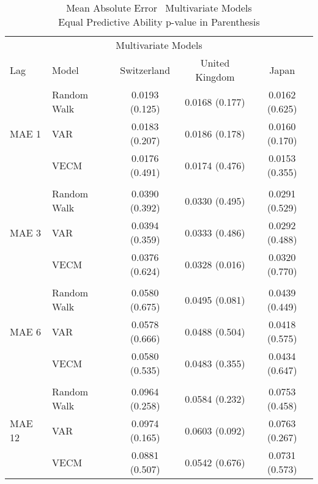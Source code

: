 \begin{table}[!h] %
  \centering
  \caption{Mean Absolute Error \textendash \ Multivariate Models \\
           Equal Predictive Ability p-value in Parenthesis}
  \begin{tabular}{llccc} %
    \toprule
    \multicolumn{5}{c}{Multivariate Models}                      \\
    \cmidrule(r){1-5}
    Lag                           &   Model                                     &Switzerland       & United Kingdom & Japan\\
    \midrule
    \multirow{3}{*}{MAE 1}        & \multicolumn{1}{l}{Random Walk}             &   0.0193 (0.125) & 0.0168 (0.177) & 0.0162 (0.625)\\  
                                  & \multicolumn{1}{l}{VAR}                     &   0.0183 (0.207) & 0.0186 (0.178) & 0.0160 (0.170)\\ 
                                  & \multicolumn{1}{l}{VECM}                    &   0.0176 (0.491) & 0.0174 (0.476) & 0.0153 (0.355)\\
    \\
    \multirow{3}{*}{MAE 3}        & \multicolumn{1}{l}{Random Walk}             &   0.0390 (0.392) & 0.0330 (0.495) & 0.0291 (0.529)\\ 
                                  & \multicolumn{1}{l}{VAR}                     &   0.0394 (0.359) & 0.0333 (0.486) & 0.0292 (0.488)\\
                                  & \multicolumn{1}{l}{VECM}                    &   0.0376 (0.624) & 0.0328 (0.016) & 0.0320 (0.770)\\
                                                                             
    \\
    \multirow{3}{*}{MAE 6}        & \multicolumn{1}{l}{Random Walk}             &   0.0580 (0.675) & 0.0495 (0.081) & 0.0439 (0.449)\\
                                  & \multicolumn{1}{l}{VAR}                     &   0.0578 (0.666) & 0.0488 (0.504) & 0.0418 (0.575)\\
                                  & \multicolumn{1}{l}{VECM}                    &   0.0580 (0.535) & 0.0483 (0.355) & 0.0434 (0.647)\\
     \\
    \multirow{3}{*}{MAE 12}       & \multicolumn{1}{l}{Random Walk}             &   0.0964 (0.258) & 0.0584 (0.232) & 0.0753 (0.458)\\
                                  & \multicolumn{1}{l}{VAR}                     &   0.0974 (0.165) & 0.0603 (0.092) & 0.0763 (0.267)\\
                                  & \multicolumn{1}{l}{VECM}                    &   0.0881 (0.507) & 0.0542 (0.676) & 0.0731 (0.573)\\
    \bottomrule
  \end{tabular}
  \label{table:MAEmultivariate}
  \vspace{1em}  
\end{table}

